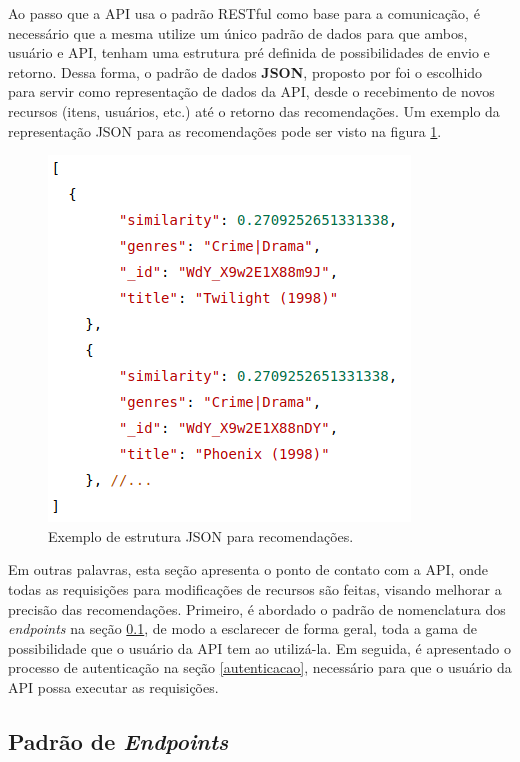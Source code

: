 \documentclass[12pt, openright, oneside, a4paper, brazil]{abntex2}
\begin{document}
Ao passo que a API usa o padrão RESTful como base para a comunicação, é necessário que a mesma utilize um único padrão de dados para que ambos, usuário e API, tenham uma estrutura pré definida de possibilidades de envio e retorno. Dessa forma, o padrão de dados \textbf{JSON}, proposto por  foi o escolhido para servir como representação de dados da API, desde o recebimento de novos recursos (itens, usuários, etc.) até o retorno das recomendações. Um exemplo da representação JSON para as recomendações pode ser visto na figura \ref{json_example}.

\begin{figure}[h!tp]
	\caption{\label{json_example}Exemplo de estrutura JSON para recomendações.}
	\begin{center}
		\includegraphics[scale=0.75]{images/json_example.png}
	\end{center}
	\hspace{5.5cm}{Fonte: O Autor.}
\end{figure}

Em outras palavras, esta seção apresenta o ponto de contato com a API, onde todas as requisições para modificações de recursos são feitas, visando melhorar a precisão das recomendações. Primeiro, é abordado o padrão de nomenclatura dos \textit{endpoints} na seção \ref{endpoints}, de modo a esclarecer de forma geral, toda a gama de possibilidade que o usuário da API tem ao utilizá-la. Em seguida, é apresentado o processo de autenticação na seção \ref{autenticacao}, necessário para que o usuário da API possa executar as requisições.

\subsection{Padrão de \textit{Endpoints}} \label{endpoints}
\end{document}
